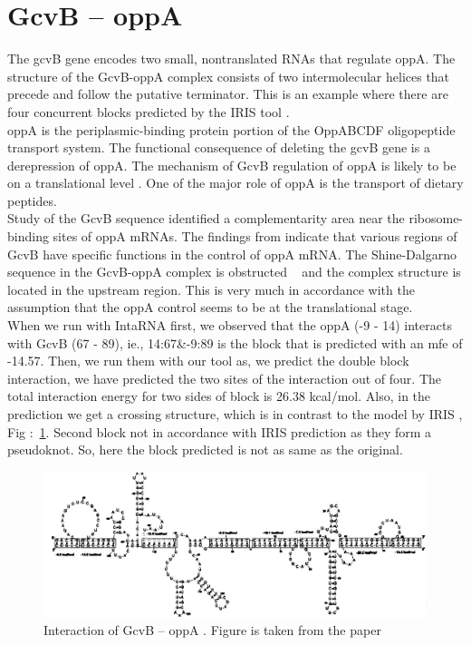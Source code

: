\documentclass[twoside,a4paper]{report}
\numberwithin{equation}{section}
\begin{document}
\clearpage

	\section{GcvB – oppA }
    The gcvB gene encodes two small, nontranslated RNAs that regulate oppA. The structure of the GcvB-oppA complex consists of two intermolecular helices that precede and follow the putative terminator. This is an example where there are four concurrent blocks predicted by the IRIS tool {\citep{pervouchine2004iris}}. \\ 
    
     oppA is the periplasmic-binding protein portion of the OppABCDF oligopeptide transport system. The functional consequence of deleting the gcvB gene is a derepression of oppA. The mechanism of GcvB regulation of oppA is likely to be on a translational level \citep{urbanowski2000gcvb}. One of the major role of oppA is the transport of dietary peptides.\\
    
    Study of the GcvB sequence identified a complementarity area near the ribosome-binding sites of oppA mRNAs. The findings from {\citep{pulvermacher2008role}} indicate that various regions of GcvB have specific functions in the control of oppA mRNA. The Shine-Dalgarno sequence in the GcvB-oppA complex is obstructed ~\citep{pervouchine2004iris} and the complex structure is located in the upstream region. This is very much in accordance with the assumption that the oppA control seems to be at the translational stage. \\
    
    When we run with IntaRNA first, we observed that the oppA (-9 - 14) interacts with GcvB (67 - 89), ie., 14:67\&-9:89 is the block that is predicted with an mfe of -14.57. Then, we run them with our tool as, we predict the double block interaction, we have predicted the two sites of the interaction out of four. The total interaction energy for two sides of block is 26.38 kcal/mol. Also, in the prediction we get a crossing structure, which is in contrast to the model by IRIS , Fig :~\ref{fig:oppa}. Second block not in accordance with IRIS prediction as they form a pseudoknot. So, here the block predicted is not as same as the original.\\
	
		\begin{figure}[h!tb]
		\includegraphics[width=1.0\linewidth]{oppa}
		\centering
		\caption{ Interaction of GcvB – oppA . Figure is taken from the paper \citep{pervouchine2004iris}} 
		\label{fig:oppa}
	\end{figure}
\end{document}
